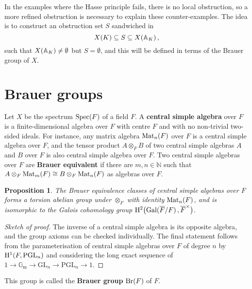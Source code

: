 \documentclass{article}
\theoremstyle{plain}
\newtheorem*{proposition}{Proposition}
\theoremstyle{definition}
\renewcommand{\AA}{\mathbb{A}}
\newcommand{\Br}{\mathrm{Br}}
\newcommand{\Gal}{\mathrm{Gal}}
\newcommand{\GG}{\mathbb{G}}
\newcommand{\GL}{\mathrm{GL}}
\renewcommand{\H}{\mathrm{H}}
\newcommand{\m}{\mathrm{m}}
\newcommand{\Mat}{\mathrm{Mat}}
\newcommand{\NN}{\mathbb{N}}
\newcommand{\PGL}{\mathrm{PGL}}
\newcommand{\Spec}{\mathrm{Spec}}
\newcommand{\br}{\!\del}
\begin{document}
In the examples where the Hasse principle fails, there is no local obstruction, so a more refined obstruction is necessary to explain these counter-examples. The idea is to construct an obstruction set $ S $ sandwiched in
$$ X\br{K} \subseteq S \subseteq X\br{\AA_K}, $$
such that $ X\br{\AA_K} \ne \emptyset $ but $ S = \emptyset $, and this will be defined in terms of the Brauer group of $ X $.

\section{Brauer groups}

Let $ X $ be the spectrum $ \Spec\br{F} $ of a field $ F $. A \textbf{central simple algebra} over $ F $ is a finite-dimensional algebra over $ F $ with centre $ F $ and with no non-trivial two-sided ideals. For instance, any matrix algebra $ \Mat_n\br{F} $ over $ F $ is a central simple algebra over $ F $, and the tensor product $ A \otimes_F B $ of two central simple algebras $ A $ and $ B $ over $ F $ is also central simple algebra over $ F $. Two central simple algebras over $ F $ are \textbf{Brauer equivalent} if there are $ m, n \in \NN $ such that $ A \otimes_F \Mat_m\br{F} \cong B \otimes_F \Mat_n\br{F} $ as algebras over $ F $.

\begin{proposition}
The Brauer equivalence classes of central simple algebras over $ F $ forms a torsion abelian group under $ \otimes_F $ with identity $ \Mat_n\br{F} $, and is isomorphic to the Galois cohomology group $ \H^2\br[1]{\Gal\br[0]{\overline{F} / F}, \overline{F}^\times} $.
\end{proposition}

\begin{proof}[Sketch of proof]
The inverse of a central simple algebra is its opposite algebra, and the group axioms can be checked individually. The final statement follows from the parameterisation of central simple algebras over $ F $ of degree $ n $ by $ \H^1\br{F, \PGL_n} $ and considering the long exact sequence of $ 1 \to \GG_\m \to \GL_n \to \PGL_n \to 1 $.
\end{proof}

This group is called the \textbf{Brauer group} $ \Br\br{F} $ of $ F $.

\pagebreak
\end{document}
